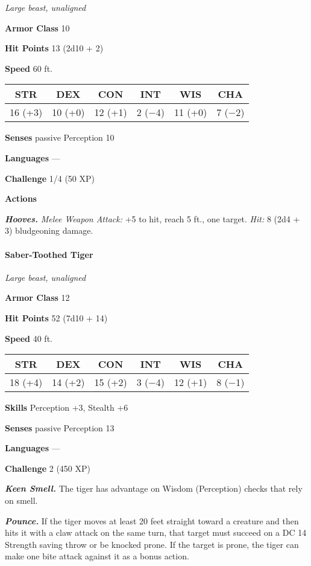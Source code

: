 \documentclass[
]{article}
\begin{document}
\emph{Large beast, unaligned}

\textbf{Armor Class} 10

\textbf{Hit Points} 13 (2d10 + 2)

\textbf{Speed} 60 ft.

\begin{longtable}[]{@{}cccccc@{}}
\toprule
STR & DEX & CON & INT & WIS & CHA\tabularnewline
\midrule
\endhead
16 (+3) & 10 (+0) & 12 (+1) & 2 (−4) & 11 (+0) & 7 (−2)\tabularnewline
\bottomrule
\end{longtable}

\textbf{Senses} passive Perception 10

\textbf{Languages} ---

\textbf{Challenge} 1/4 (50 XP)

\textbf{Actions}

\emph{\textbf{Hooves.}} \emph{Melee Weapon Attack:} +5 to hit, reach 5
ft., one target. \emph{Hit:} 8 (2d4 + 3) bludgeoning damage.

\hypertarget{saber-toothed-tiger}{%
\paragraph{Saber-Toothed Tiger}\label{saber-toothed-tiger}}

\emph{Large beast, unaligned}

\textbf{Armor Class} 12

\textbf{Hit Points} 52 (7d10 + 14)

\textbf{Speed} 40 ft.

\begin{longtable}[]{@{}cccccc@{}}
\toprule
STR & DEX & CON & INT & WIS & CHA\tabularnewline
\midrule
\endhead
18 (+4) & 14 (+2) & 15 (+2) & 3 (−4) & 12 (+1) & 8 (−1)\tabularnewline
\bottomrule
\end{longtable}

\textbf{Skills} Perception +3, Stealth +6

\textbf{Senses} passive Perception 13

\textbf{Languages} ---

\textbf{Challenge} 2 (450 XP)

\emph{\textbf{Keen Smell.}} The tiger has advantage on Wisdom
(Perception) checks that rely on smell.

\emph{\textbf{Pounce.}} If the tiger moves at least 20 feet straight
toward a creature and then hits it with a claw attack on the same turn,
that target must succeed on a DC 14 Strength saving throw or be knocked
prone. If the target is prone, the tiger can make one bite attack
against it as a bonus action.
\end{document}
